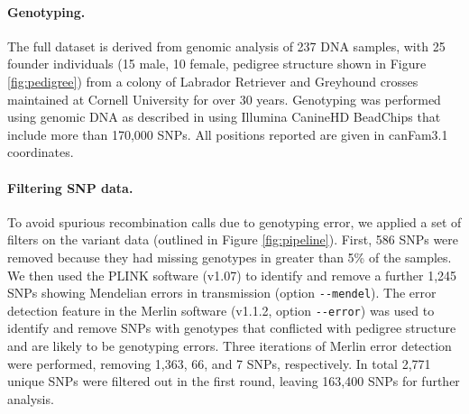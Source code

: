 \paragraph{Genotyping.}
The full dataset is derived from genomic analysis of 237 DNA samples, with 25 founder individuals (15 male, 10 female, pedigree structure shown in Figure \ref{fig:pedigree}) from a colony of Labrador Retriever and Greyhound crosses maintained at Cornell University for over 30 years\cite{Todhunter2003}.
Genotyping was performed using genomic DNA as described in \citet{Hayward2016} using Illumina CanineHD BeadChips that include more than 170,000 SNPs. 
All positions reported are given in canFam3.1 coordinates.



\paragraph{Filtering SNP data.}
To avoid spurious recombination calls due to genotyping error, we applied a set of filters on the variant data (outlined in Figure \ref{fig:pipeline}).
First, 586 SNPs were removed because they had missing genotypes in greater than 5\% of the samples.
We then used the PLINK\cite{Purcell2007} software (v1.07) to identify and remove a further 1,245 SNPs showing Mendelian errors in transmission (option \verb|--mendel|).
The error detection feature in the Merlin\cite{Abecasis2002} software (v1.1.2, option \verb|--error|) was used to identify and remove SNPs with genotypes that conflicted with pedigree structure and are likely to be genotyping errors.
Three iterations of Merlin error detection were performed, removing 1,363, 66, and 7 SNPs, respectively.
In total 2,771 unique SNPs were filtered out in the first round, leaving 163,400 SNPs for further analysis.


